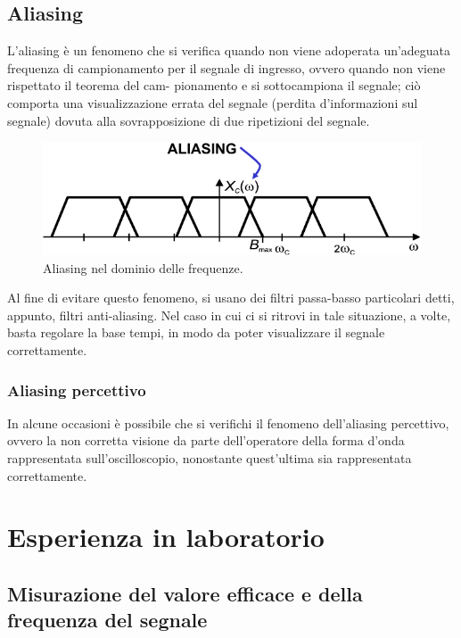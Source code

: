 \documentclass[a4paper]{article}
\begin{document}
		\subsection{Aliasing}
			L’aliasing è un fenomeno che si verifica quando non viene adoperata un’adeguata frequenza di campionamento per il segnale di ingresso, ovvero quando non viene rispettato il teorema del cam-
			\newline
			pionamento e si sottocampiona il segnale; ciò comporta una visualizzazione errata del segnale (perdita d'informazioni sul segnale) dovuta alla sovrapposizione di due ripetizioni del segnale.
			\begin{figure}[h!]
				\centering
				\includegraphics[scale=0.4]{aliasing}
				\caption{Aliasing nel dominio delle frequenze.}
				\label{fig:aliasing}
			\end{figure}
			\newpage
			Al fine di evitare questo fenomeno, si usano dei filtri passa-basso particolari detti, appunto, filtri anti-aliasing. Nel caso in cui ci si ritrovi in tale situazione, a volte, basta regolare la base tempi, in modo da poter visualizzare il segnale correttamente.
			\subsubsection{Aliasing percettivo}
				In alcune occasioni è possibile che si verifichi il fenomeno dell’aliasing percettivo, ovvero la non corretta visione da parte dell’operatore della forma d’onda rappresentata sull’oscilloscopio, nonostante quest’ultima sia rappresentata correttamente.
	\section{Esperienza in laboratorio}
		\subsection{Misurazione del valore efficace e della frequenza del segnale}
\end{document}
